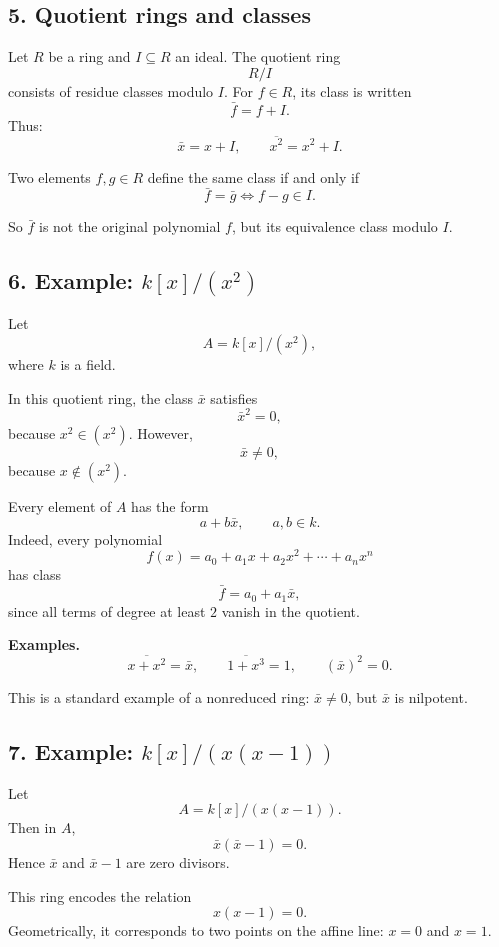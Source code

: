 \documentclass[12pt,a4paper,oneside]{report}
\theoremstyle{notespace}
\begin{document}
	\subsection{5. Quotient rings and classes}
	
	Let \(R\) be a ring and \(I\subseteq R\) an ideal. The quotient ring
	\[
	R/I
	\]
	consists of residue classes modulo \(I\). For \(f\in R\), its class is written
	\[
	\bar f=f+I.
	\]
	Thus:
	\[
	\bar x=x+I,\qquad \overline{x^2}=x^2+I.
	\]
	
	Two elements \(f,g\in R\) define the same class if and only if
	\[
	\bar f=\bar g
	\iff
	f-g\in I.
	\]
	
	So \(\bar f\) is not the original polynomial \(f\), but its equivalence class modulo \(I\).
	
	\subsection{6. Example: \(k[x]/(x^2)\)}
	
	Let
	\[
	A=k[x]/(x^2),
	\]
	where \(k\) is a field.
	
	In this quotient ring, the class \(\bar x\) satisfies
	\[
	\bar x^2=0,
	\]
	because \(x^2\in (x^2)\). However,
	\[
	\bar x\neq 0,
	\]
	because \(x\notin (x^2)\).
	
	Every element of \(A\) has the form
	\[
	a+b\bar x,
	\qquad a,b\in k.
	\]
	Indeed, every polynomial
	\[
	f(x)=a_0+a_1x+a_2x^2+\cdots+a_nx^n
	\]
	has class
	\[
	\bar f=a_0+a_1\bar x,
	\]
	since all terms of degree at least \(2\) vanish in the quotient.
	
	\medskip
	
	\noindent
	\textbf{Examples.}
	\[
	\overline{x+x^2}=\bar x,
	\qquad
	\overline{1+x^3}=1,
	\qquad
	(\bar x)^2=0.
	\]
	
	This is a standard example of a nonreduced ring: \(\bar x\neq 0\), but \(\bar x\) is nilpotent.
	
	\subsection{7. Example: \(k[x]/(x(x-1))\)}
	
	Let
	\[
	A=k[x]/(x(x-1)).
	\]
	Then in \(A\),
	\[
	\bar x(\bar x-1)=0.
	\]
	Hence \(\bar x\) and \(\bar x-1\) are zero divisors.
	
	This ring encodes the relation
	\[
	x(x-1)=0.
	\]
	Geometrically, it corresponds to two points on the affine line: \(x=0\) and \(x=1\).
	
	\medskip
	
\end{document}
